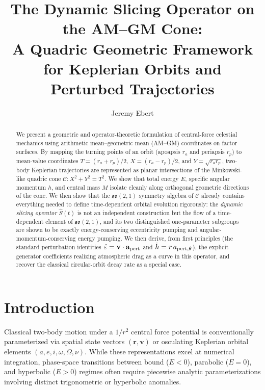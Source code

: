 \documentclass[11pt]{amsart}
\title{The Dynamic Slicing Operator on the AM--GM Cone:\\
A Quadric Geometric Framework for Keplerian Orbits and Perturbed Trajectories}
\author{Jeremy Ebert}
\begin{document}
\begin{abstract}
We present a geometric and operator-theoretic formulation of central-force celestial mechanics using arithmetic mean--geometric mean (AM--GM) coordinates on factor surfaces. By mapping the turning points of an orbit (apoapsis $r_a$ and periapsis $r_p$) to mean-value coordinates $T=(r_a+r_p)/2$, $X=(r_a-r_p)/2$, and $Y=\sqrt{r_ar_p}$, two-body Keplerian trajectories are represented as planar intersections of the Minkowski-like quadric cone $\mathcal C: X^2+Y^2=T^2$. We show that total energy $E$, specific angular momentum $h$, and central mass $M$ isolate cleanly along orthogonal geometric directions of the cone. We then show that the $\mathfrak{so}(2,1)$ symmetry algebra of $\mathcal C$ already contains everything needed to define time-dependent orbital evolution rigorously: the \emph{dynamic slicing operator} $\hat S(t)$ is not an independent construction but the flow of a time-dependent element of $\mathfrak{so}(2,1)$, and its two distinguished one-parameter subgroups are shown to be exactly energy-conserving eccentricity pumping and angular-momentum-conserving energy pumping. We then derive, from first principles (the standard perturbation identities $\dot\varepsilon=\mathbf v\cdot\mathbf a_{\rm pert}$ and $\dot h = r\,a_{\rm pert,\theta}$), the explicit generator coefficients realizing atmospheric drag as a curve in this operator, and recover the classical circular-orbit decay rate as a special case.
\end{abstract}


\maketitle

\section{Introduction}

Classical two-body motion under a $1/r^2$ central force potential is conventionally parameterized via spatial state vectors $(\mathbf r,\mathbf v)$ or osculating Keplerian orbital elements $(a,e,i,\omega,\Omega,\nu)$. While these representations excel at numerical integration, phase-space transitions between bound ($E<0$), parabolic ($E=0$), and hyperbolic ($E>0$) regimes often require piecewise analytic parameterizations involving distinct trigonometric or hyperbolic anomalies.
\end{document}
